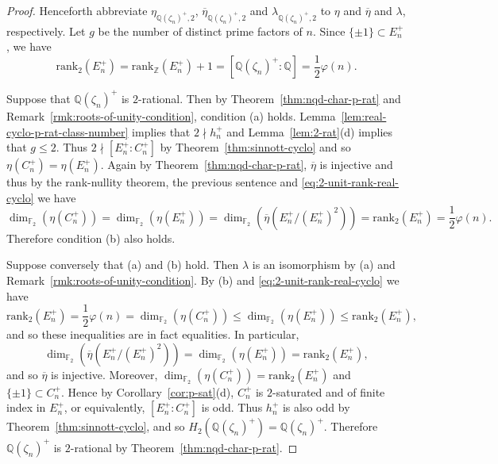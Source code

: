 \documentclass[12pt, a4paper, usenames]{amsart}
\newcommand{\Z}{\mathbb{Z}}
\newcommand{\Q}{\mathbb{Q}}
\newcommand{\F}{\mathbb{F}}
\theoremstyle{plain}
\theoremstyle{remark}
\theoremstyle{definition}
\newcommand{\rank}{\mathrm{rank}}
\begin{document}
\begin{proof}
Henceforth abbreviate $\eta_{\Q(\zeta_{n})^{+},2}$, $\overline{\eta}_{\Q(\zeta_{n})^{+},2}$
and $\lambda_{\Q(\zeta_{n})^{+},2}$ to $\eta$ and $\overline{\eta}$ and
$\lambda$, respectively.
Let $g$ be the number of distinct prime factors of $n$.
Since $\{ \pm 1 \} \subset E_{n}^{+}$, we have
\begin{equation}\label{eq:2-unit-rank-real-cyclo}
\rank_{2}(E_{n}^{+}) 
= \rank_{\Z}(E_{n}^{+}) + 1
= [\Q(\zeta_{n})^{+}:\Q]
= \textstyle{\frac{1}{2}}\varphi(n).
\end{equation}

Suppose that $\Q(\zeta_{n})^{+}$ is $2$-rational.
Then by Theorem~\ref{thm:nqd-char-p-rat} and 
Remark~\ref{rmk:roots-of-unity-condition}, condition (a) holds. 
Lemma~\ref{lem:real-cyclo-p-rat-class-number} implies that $2 \nmid h_{n}^{+}$
and Lemma~\ref{lem:2-rat}(d) implies that $g \leq 2$.
Thus $2 \nmid [E_{n}^{+} : C_{n}^{+}]$ by Theorem~\ref{thm:sinnott-cyclo} and
so $\eta(C_{n}^{+}) = \eta(E_{n}^{+})$.
Again by Theorem~\ref{thm:nqd-char-p-rat}, $\overline{\eta}$ is injective
and thus by the rank-nullity theorem, the previous sentence and \eqref{eq:2-unit-rank-real-cyclo} we have 
\[
\dim_{\F_{2}}(\eta(C_{n}^{+}))
=
\dim_{\F_{2}}(\eta(E_{n}^{+}))
=
\dim_{\F_{2}}(\overline{\eta}(E_{n}^{+}/(E_{n}^{+})^{2}))
=
\rank_{2}(E_{n}^{+})
= 
\textstyle{\frac{1}{2}}\varphi(n).
\]
Therefore condition (b) also holds.

Suppose conversely that (a) and (b) hold. 
Then $\lambda$ is an isomorphism by (a) and Remark~\ref{rmk:roots-of-unity-condition}.
By (b) and \eqref{eq:2-unit-rank-real-cyclo} we have
\[
\rank_{2}(E_{n}^{+})
=
\textstyle{\frac{1}{2}}\varphi(n)
= 
\dim_{\F_{2}}(\eta(C_{n}^{+}))
\leq 
\dim_{\F_{2}}(\eta(E_{n}^{+})) 
\leq 
\rank_{2}(E_{n}^{+}),
\]
and so these inequalities are in fact equalities. 
In particular, 
\[
\dim_{\F_{2}}(\overline{\eta}(E_{n}^{+}/(E_{n}^{+})^{2})) 
= \dim_{\F_{2}}(\eta(E_{n}^{+}))
=\rank_{2}(E_{n}^{+}),
\]
and so $\overline{\eta}$ is injective.
Moreover, 
$\dim_{\F_{2}}(\eta(C_{n}^{+}))=\rank_{2}(E_{n}^{+})$
and $\{ \pm 1 \} \subset  C_{n}^{+}$.
Hence by Corollary~\ref{cor:p-sat}(d),
$C_{n}^{+}$ is $2$-saturated and of finite index in $E_{n}^{+}$,
or equivalently, $[E_{n}^{+}:C_{n}^{+}]$ is odd.
Thus $h_{n}^{+}$ is also odd by Theorem~\ref{thm:sinnott-cyclo},
and so $H_{2}(\Q(\zeta_{n})^{+})=\Q(\zeta_{n})^{+}$.
Therefore $\Q(\zeta_{n})^{+}$ is $2$-rational by Theorem~\ref{thm:nqd-char-p-rat}.
\end{proof}
\end{document}
